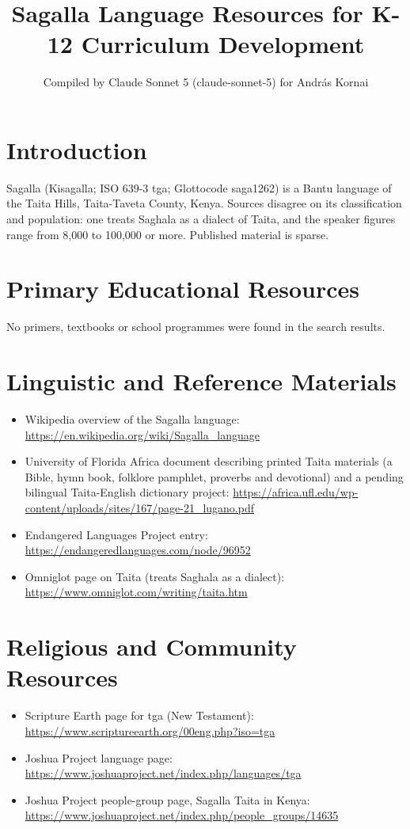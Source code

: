 \documentclass[12pt]{article}
\title{Sagalla Language Resources for K-12 Curriculum Development}
\author{Compiled by Claude Sonnet 5 (claude-sonnet-5) for Andr\'as Kornai}
\date{}
\begin{document}
\maketitle

\section{Introduction}
Sagalla (Kisagalla; ISO 639-3 tga; Glottocode saga1262) is a Bantu language of the Taita Hills, Taita-Taveta County, Kenya. Sources disagree on its classification and population: one treats Saghala as a dialect of Taita, and the speaker figures range from 8,000 to 100,000 or more. Published material is sparse.

\section{Primary Educational Resources}
No primers, textbooks or school programmes were found in the search results.

\section{Linguistic and Reference Materials}
\begin{itemize}
\item Wikipedia overview of the Sagalla language: \url{https://en.wikipedia.org/wiki/Sagalla_language}
\item University of Florida Africa document describing printed Taita materials (a Bible, hymn book, folklore pamphlet, proverbs and devotional) and a pending bilingual Taita-English dictionary project: \url{https://africa.ufl.edu/wp-content/uploads/sites/167/page-21_lugano.pdf}
\item Endangered Languages Project entry: \url{https://endangeredlanguages.com/node/96952}
\item Omniglot page on Taita (treats Saghala as a dialect): \url{https://www.omniglot.com/writing/taita.htm}
\end{itemize}

\section{Religious and Community Resources}
\begin{itemize}
\item Scripture Earth page for tga (New Testament): \url{https://www.scriptureearth.org/00eng.php?iso=tga}
\item Joshua Project language page: \url{https://www.joshuaproject.net/index.php/languages/tga}
\item Joshua Project people-group page, Sagalla Taita in Kenya: \url{https://www.joshuaproject.net/index.php/people_groups/14635}
\end{itemize}
\end{document}
